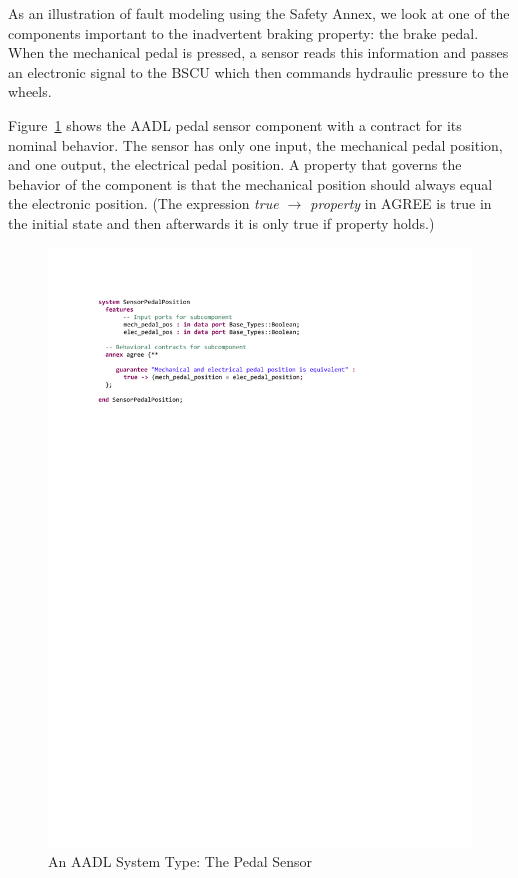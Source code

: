 As an illustration of fault modeling using the Safety Annex, we look at one of the components important to the inadvertent braking property: the brake pedal. When the mechanical pedal is pressed, a sensor reads this information and passes an electronic signal to the BSCU which then commands hydraulic pressure to the wheels. 

Figure~\ref{fig:sensor} shows the AADL pedal sensor component with a contract for its nominal behavior. The sensor has only one input, the mechanical pedal position, and one output, the electrical pedal position. 
A property that governs the behavior of the component is that the mechanical position should always equal the electronic position. (The expression \textit{true $\rightarrow$ property} in AGREE is true in the initial state and then afterwards it is only true if property holds.)

\begin{figure}[h!]
	\hspace*{-2cm}
	\begin{center}
		\includegraphics[trim=0 640 -10 70,clip,width=1.5\dimexpr\textwidth-2cm\relax]{images/system_sensor.pdf}
		\vspace{-0.3in}
		\caption{An AADL System Type: The Pedal Sensor}
		\label{fig:sensor}
	\end{center}
	\vspace{-0.2in}
\end{figure}

